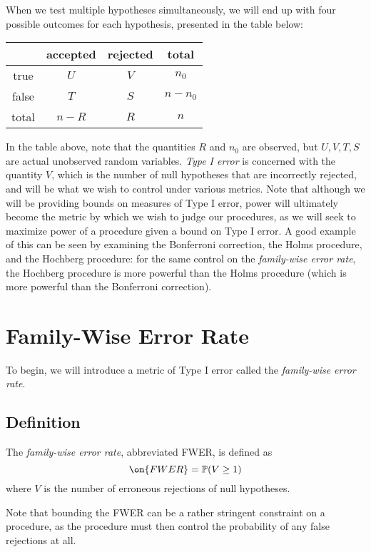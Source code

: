 \documentclass[11pt,reqno]{report}
\theoremstyle{definition}
\numberwithin{equation}{section}
\begin{document}
When we test multiple hypotheses simultaneously, we will end up with four possible outcomes for each hypothesis, presented in the table below:
\begin{center}
\begin{tabular}{c|cc|c}
& accepted & rejected & total \\ \hline
true & $U$ & $V$ & $n_0$ \\ 
false & $T$ & $S$ & $n - n_0$ \\ \hline
total & $n - R$ & $R$ & $n$
\end{tabular}
\end{center}
In the table above, note that the quantities $R$ and $n_0$ are observed, but $U,V,T,S$ are actual unobserved random variables. \emph{Type I error} is concerned with the quantity $V$, which is the number of null hypotheses that are incorrectly rejected, and will be what we wish to control under various metrics. Note that although we will be providing bounds on measures of Type I error, power will ultimately become the metric by which we wish to judge our procedures, as we will seek to maximize power of a procedure given a bound on Type I error. A good example of this can be seen by examining the Bonferroni correction, the Holms procedure, and the Hochberg procedure: for the same control on the \emph{family-wise error rate}, the Hochberg procedure is more powerful than the Holms procedure (which is more powerful than the Bonferroni correction).

\section{Family-Wise Error Rate}
To begin, we will introduce a metric of Type I error called the \emph{family-wise error rate}.
\subsection{Definition}
\begin{defn}
The \emph{family-wise error rate}, abbreviated FWER, is defined as
\begin{equation}
\on{FWER} = \mathbb{P}(V \geq  1)
\end{equation}
where $V$ is the number of erroneous rejections of null hypotheses.
\end{defn}
Note that bounding the FWER can be a rather stringent constraint on a procedure, as the procedure must then control the probability of any false rejections at all. 
\end{document}
